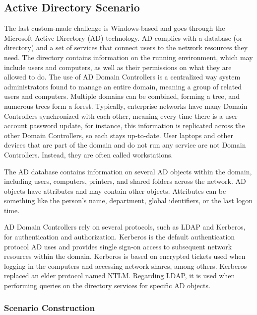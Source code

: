 
\subsection{Active Directory Scenario} \label{sec:validation_ad_scenario}

The last custom-made challenge is Windows-based and goes through the Microsoft Active Directory (AD) technology. AD complies with a database (or directory) and a set of services that connect users to the network resources they need. The directory contains information on the running environment, which may include users and computers, as well as their permissions on what they are allowed to do. The use of AD Domain Controllers is a centralized way system administrators found to manage an entire domain, meaning a group of related users and computers. Multiple domains can be combined, forming a tree, and numerous trees form a forest. Typically, enterprise networks have many Domain Controllers synchronized with each other, meaning every time there is a user account password update, for instance, this information is replicated across the other Domain Controllers, so each stays up-to-date. User laptops and other devices that are part of the domain and do not run any service are not Domain Controllers. Instead, they are often called workstations.

The AD database contains information on several AD objects within the domain, including users, computers, printers, and shared folders across the network. AD objects have attributes and may contain other objects. Attributes can be something like the person's name, department, global identifiers, or the last logon time.

AD Domain Controllers rely on several protocols, such as LDAP and Kerberos, for authentication and authorization. Kerberos is the default authentication protocol AD uses and provides single sign-on access to subsequent network resources within the domain. Kerberos is based on encrypted tickets used when logging in the computers and accessing network shares, among others. Kerberos replaced an elder protocol named NTLM. Regarding LDAP, it is used when performing queries on the directory services for specific AD objects.

\subsubsection{Scenario Construction} \label{sec:validation_ad_scenario_construction}

